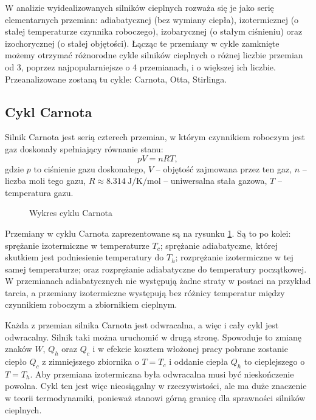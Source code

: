 W analizie wyidealizowanych silników cieplnych rozważa się je jako serię elementarnych przemian: adiabatycznej (bez wymiany ciepła), izotermicznej (o stałej temperaturze czynnika roboczego), izobarycznej (o stałym ciśnieniu) oraz izochorycznej (o stałej objętości). Łącząc te przemiany w cykle zamknięte możemy otrzymać różnorodne cykle silników cieplnych o różnej liczbie przemian od 3, poprzez najpopularniejsze o 4 przemianach, i o większej ich liczbie. Przeanalizowane zostaną tu cykle: Carnota, Otta, Stirlinga.

\subsection{Cykl Carnota}
Silnik Carnota jest serią czterech przemian, w którym czynnikiem roboczym jest gaz doskonały spełniający równanie stanu:
\begin{equation}\label{eq:def_gaz_doskonaly}
	pV = nRT,
\end{equation}
gdzie \(p\) to ciśnienie gazu doskonałego, \(V\) -- objętość zajmowana przez ten gaz, \(n\) -- liczba moli tego gazu, \(R \approx \qty{8.314}{\joule / \kelvin / \mol}\) -- uniwersalna stała gazowa, \(T\) -- temperatura gazu.

\begin{figure}
	\centering
	
	\caption{Wykres cyklu Carnota}
	\label{fig:pv_silnik_carnot}
\end{figure}

Przemiany w cyklu Carnota zaprezentowane są na rysunku \ref{fig:pv_silnik_carnot}. Są to po kolei: sprężanie izotermiczne w temperaturze $T_c$; sprężanie adiabatyczne, której skutkiem jest podniesienie temperatury do $T_h$; rozprężanie izotermiczne w tej samej temperaturze; oraz rozprężanie adiabatyczne do temperatury początkowej. W przemianach adiabatycznych nie występują żadne straty w postaci na przykład tarcia, a przemiany izotermiczne występują bez różnicy temperatur między czynnikiem roboczym a zbiornikiem cieplnym.

Każda z przemian silnika Carnota jest odwracalna, a więc i cały cykl jest odwracalny. Silnik taki można uruchomić w drugą stronę. Spowoduje to zmianę znaków $W$, $Q_h$ oraz $Q_c$ i w efekcie kosztem włożonej pracy pobrane zostanie ciepło $Q_c$ z zimniejszego zbiornika o $T = T_c$ i oddanie ciepła $Q_h$ to cieplejszego o $T = T_h$. Aby przemiana izotermiczna była odwracalna musi być nieskończenie powolna. Cykl ten jest więc nieosiągalny w rzeczywistości, ale ma duże znaczenie w teorii termodynamiki, ponieważ stanowi górną granicę dla sprawności silników cieplnych.


